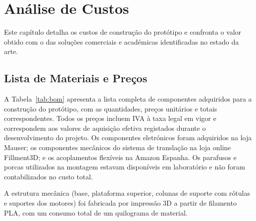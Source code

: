 

\chapter{Análise de Custos}
\label{chapter:costs}

\begin{introduction}
Este capítulo detalha os custos de construção do protótipo e confronta o valor obtido com o das soluções comerciais e académicas identificadas no estado da arte.
\end{introduction}

\section{Lista de Materiais e Preços}
\label{sec:lista-materiais}

A Tabela~\ref{tab:bom} apresenta a lista completa de componentes adquiridos para a construção do protótipo, com as quantidades, preços unitários e totais correspondentes. Todos os preços incluem IVA à taxa legal em vigor e correspondem aos valores de aquisição efetiva registados durante o desenvolvimento do projeto. Os componentes eletrónicos foram adquiridos na loja Mauser; os componentes mecânicos do sistema de translação na loja online Fillment3D; e os acoplamentos flexíveis na Amazon Espanha. Os parafusos e porcas utilizados na montagem estavam disponíveis em laboratório e não foram contabilizados no custo total.

A estrutura mecânica (base, plataforma superior, colunas de suporte com rótulas e suportes dos motores) foi fabricada por impressão 3D a partir de filamento PLA, com um consumo total de um quilograma de material.

